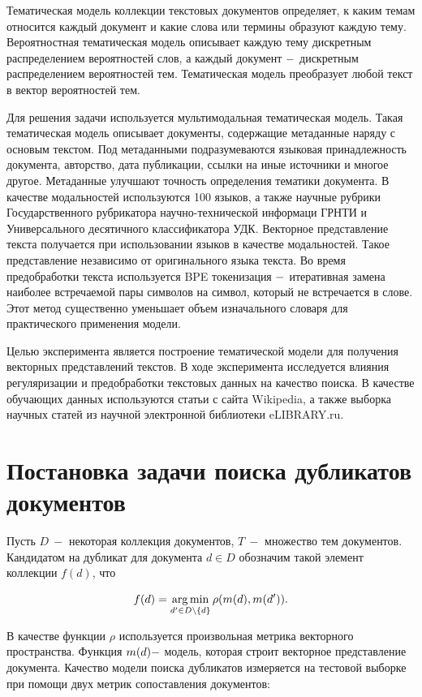 \documentclass[12pt, twoside]{article}
\begin{document}
Тематическая модель коллекции текстовых документов определяет, к каким темам относится каждый документ и какие слова или термины образуют каждую тему. Вероятностная тематическая модель описывает каждую тему дискретным распределением вероятностей слов, а каждый документ $\--$ дискретным распределением вероятностей тем. Тематическая модель преобразует любой текст в вектор вероятностей тем. 

Для решения задачи используется мультимодальная тематическая модель. Такая тематическая модель описывает документы, содержащие метаданные наряду с основым текстом. Под метаданными подразумеваются языковая принадлежность документа, авторство, дата публикации, ссылки на иные источники и многое другое. Метаданные улучшают точность определения тематики документа. В качестве модальностей используются 100 языков, а также научные рубрики Государственного рубрикатора научно-технической информаци ГРНТИ\cite{GRNTI} и Универсального десятичного классификатора УДК\cite{UDK}. Векторное представление текста получается при использовании языков в качестве модальностей. Такое представление независимо от оригинального языка текста. Во время предобработки текста используется BPE токенизация $\--$ итеративная замена наиболее встречаемой пары символов на символ, который не встречается в слове. Этот метод существенно уменьшает объем изначального словаря для практического применения модели.

Целью эксперимента является построение тематической модели для получения векторных представлений текстов. В ходе эксперимента исследуется влияния регуляризации и предобработки текстовых данных на качество поиска. В качестве обучающих данных используются статьи с сайта Wikipedia, а также выборка научных статей из научной электронной библиотеки eLIBRARY.ru.

\section{Постановка задачи поиска дубликатов документов}

Пусть $D~-$ некоторая коллекция документов, $T~-$ множество тем документов. Кандидатом на дубликат  для документа $d \in D$ обозначим такой элемент коллекции $f(d)$, что 

\[f(d) = \argmin_{d' \in D \setminus \{d\}} \rho(m(d), m(d')).\]

В качестве функции $\rho$ используется произвольная метрика векторного пространства. Функция  $m(d) \--$ модель, которая строит векторное представление документа. Качество модели поиска дубликатов измеряется на тестовой выборке при помощи двух метрик сопоставления документов:
\end{document}
